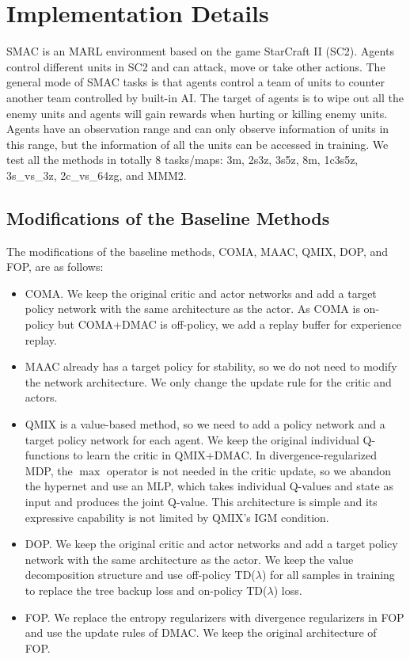 \documentclass{article}
\begin{document}
	
\section{Implementation Details}
	\label{app:details}
	SMAC is an MARL environment based on the game StarCraft II (SC2). Agents control different units in SC2 and can attack, move or take other actions. The general mode of SMAC tasks is that agents control a team of units to counter another team controlled by built-in AI. The target of agents is to wipe out all the enemy units and agents will gain rewards when hurting or killing enemy units. Agents have an observation range and can only observe information of units in this range, but the information of all the units can be accessed in training. We test all the methods in totally 8 tasks/maps: 3m, 2s3z, 3s5z, 8m, 1c3s5z, 3s\_vs\_3z, 2c\_vs\_64zg, and MMM2.
	


	
\subsection{Modifications of the Baseline Methods}
\label{app:modifications}
	The modifications of the baseline methods, COMA, MAAC, QMIX, DOP, and FOP, are as follows:
	\begin{itemize}
		\item \textsf{COMA.} We keep the original critic and actor networks and add a target policy network with the same architecture as the actor. As COMA is on-policy but COMA+DMAC is off-policy, we add a replay buffer for experience replay.
		\item \textsf{MAAC} already has a target policy for stability, so we do not need to modify the network architecture. We only change the update rule for the critic and actors.
		\item \textsf{QMIX} is a value-based method, so we need to add a policy network and a target policy network for each agent. We keep the original individual Q-functions to learn the critic in QMIX+DMAC. In divergence-regularized MDP, the $\max$ operator is not needed in the critic update, so we abandon the hypernet and use an MLP, which takes individual Q-values and state as input  and produces the joint Q-value. This architecture is simple and its expressive capability is not limited by QMIX's IGM condition.
		\item \textsf{DOP.} We keep the original critic and actor networks and add a target policy network with the same architecture as the actor. We keep the value decomposition structure and use off-policy TD($\lambda$) for all samples in training to replace the tree backup loss and on-policy TD($\lambda$) loss.
		\item \textsf{FOP.} We replace the entropy regularizers with divergence regularizers in FOP and use the update rules of DMAC. We keep the original architecture of FOP.
	\end{itemize}
\end{document}
